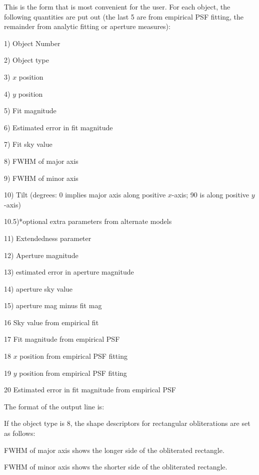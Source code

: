  This is the form that is most convenient for the user.
For each object, the following quantities are put out (the last 5 
are from empirical PSF fitting, the remainder from analytic fitting 
or aperture measures):

\item{1)} Object Number
\item{2)} Object type
\item{3)} $x$ position
\item{4)} $y$ position
\item{5)} Fit magnitude
\item{6)} Estimated error in fit magnitude
\item{7)} Fit sky value
\item{8)} FWHM of major axis
\item{9)} FWHM of minor axis
\item{10)} Tilt (degrees: 0 implies major axis along positive $x$-axis;
90 is along positive $y$-axis)
\item{10.5)}*optional extra parameters from alternate models
\item{11)} Extendedness parameter
\item{12)} Aperture magnitude  
\item{13)} estimated error in aperture magnitude
\item{14)} aperture sky value
\item{15)} aperture mag minus fit mag
\item{16} Sky value from empirical fit
\item{17} Fit magnitude from empirical PSF 
\item{18} $x$ position from empirical PSF fitting
\item{19} $y$ position from empirical PSF fitting
\item{20} Estimated error in fit magnitude from empirical PSF  

The format of the output line is:


If the object type is 8, the shape descriptors for rectangular obliterations are 
set as follows:

\noindent FWHM of 
major axis shows the longer side of the obliterated rectangle.

\noindent FWHM 
of minor axis shows the shorter side of the obliterated rectangle.

